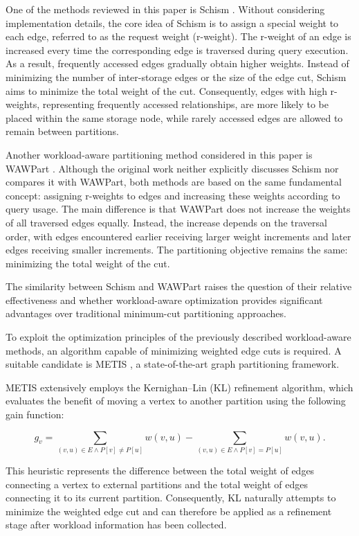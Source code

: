 One of the methods reviewed in this paper is Schism \cite{schism}. Without considering implementation details, the core idea of Schism is to assign a special weight to each edge, referred to as the request weight (r-weight). The r-weight of an edge is increased every time the corresponding edge is traversed during query execution. As a result, frequently accessed edges gradually obtain higher weights. Instead of minimizing the number of inter-storage edges or the size of the edge cut, Schism aims to minimize the total weight of the cut. Consequently, edges with high r-weights, representing frequently accessed relationships, are more likely to be placed within the same storage node, while rarely accessed edges are allowed to remain between partitions.

Another workload-aware partitioning method considered in this paper is WAWPart \cite{wawpart}. Although the original work neither explicitly discusses Schism nor compares it with WAWPart, both methods are based on the same fundamental concept: assigning r-weights to edges and increasing these weights according to query usage. The main difference is that WAWPart does not increase the weights of all traversed edges equally. Instead, the increase depends on the traversal order, with edges encountered earlier receiving larger weight increments and later edges receiving smaller increments. The partitioning objective remains the same: minimizing the total weight of the cut.

The similarity between Schism and WAWPart raises the question of their relative effectiveness and whether workload-aware optimization provides significant advantages over traditional minimum-cut partitioning approaches.

To exploit the optimization principles of the previously described workload-aware methods, an algorithm capable of minimizing weighted edge cuts is required. A suitable candidate is METIS \cite{MetisOG}, a state-of-the-art graph partitioning framework.

METIS extensively employs the Kernighan--Lin (KL) refinement algorithm, which evaluates the benefit of moving a vertex to another partition using the following gain function:

\begin{equation*}
g_v = \sum_{(v,u) \in E \wedge P[v] \neq P[u]} w(v,u) - \sum_{(v,u) \in E \wedge P[v] = P[u]} w(v,u).
\end{equation*}

This heuristic represents the difference between the total weight of edges connecting a vertex to external partitions and the total weight of edges connecting it to its current partition. Consequently, KL naturally attempts to minimize the weighted edge cut and can therefore be applied as a refinement stage after workload information has been collected.

